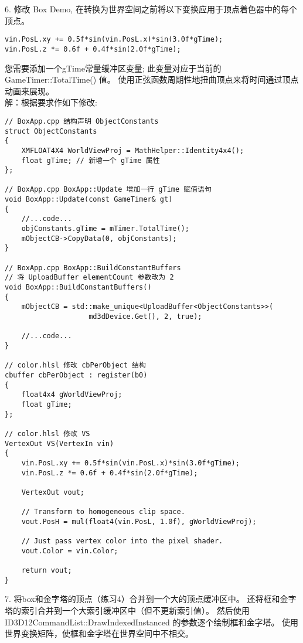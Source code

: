\begin{flushleft}
6. 修改 Box Demo, 在转换为世界空间之前将以下变换应用于顶点着色器中的每个顶点。
\end{flushleft}
\begin{lstlisting}
vin.PosL.xy += 0.5f*sin(vin.PosL.x)*sin(3.0f*gTime);
vin.PosL.z *= 0.6f + 0.4f*sin(2.0f*gTime);
\end{lstlisting}
\begin{flushleft}
您需要添加一个gTime常量缓冲区变量; 此变量对应于当前的 GameTimer::TotalTime() 值。 使用正弦函数周期性地扭曲顶点来将时间通过顶点动画来展现。\\
解：根据要求作如下修改:
\end{flushleft}
\begin{lstlisting}
// BoxApp.cpp 结构声明 ObjectConstants
struct ObjectConstants
{
    XMFLOAT4X4 WorldViewProj = MathHelper::Identity4x4();
    float gTime; // 新增一个 gTime 属性
};

// BoxApp.cpp BoxApp::Update 增加一行 gTime 赋值语句
void BoxApp::Update(const GameTimer& gt)
{
    //...code...
    objConstants.gTime = mTimer.TotalTime();
    mObjectCB->CopyData(0, objConstants);
}

// BoxApp.cpp BoxApp::BuildConstantBuffers 
// 将 UploadBuffer elementCount 参数改为 2
void BoxApp::BuildConstantBuffers()
{
    mObjectCB = std::make_unique<UploadBuffer<ObjectConstants>>(
                    md3dDevice.Get(), 2, true);

    //...code...
}

// color.hlsl 修改 cbPerObject 结构
cbuffer cbPerObject : register(b0)
{
    float4x4 gWorldViewProj;
    float gTime;
};

// color.hlsl 修改 VS
VertexOut VS(VertexIn vin)
{
    vin.PosL.xy += 0.5f*sin(vin.PosL.x)*sin(3.0f*gTime);
    vin.PosL.z *= 0.6f + 0.4f*sin(2.0f*gTime);

    VertexOut vout;

    // Transform to homogeneous clip space.
    vout.PosH = mul(float4(vin.PosL, 1.0f), gWorldViewProj);
    
    // Just pass vertex color into the pixel shader.
    vout.Color = vin.Color;

    return vout;
}
\end{lstlisting}

\begin{flushleft}
7. 将box和金字塔的顶点（练习4）合并到一个大的顶点缓冲区中。 还将框和金字塔的索引合并到一个大索引缓冲区中（但不更新索引值）。 然后使用 ID3D12CommandList::DrawIndexedInstanced 的参数逐个绘制框和金字塔。 使用世界变换矩阵，使框和金字塔在世界空间中不相交。
\end{flushleft}

